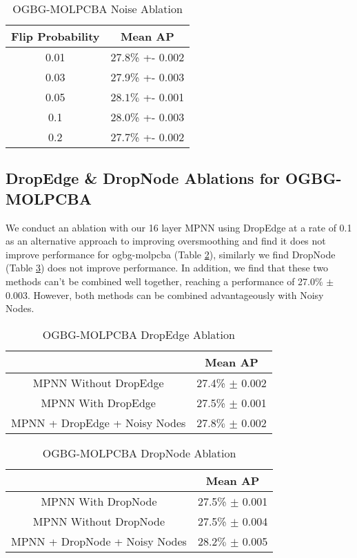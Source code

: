 \documentclass{article} \usepackage{iclr2022_conference,times}
\begin{document}
\begin{table}[]
    \centering
    \begin{tabular}{c|c}
        \toprule
        Flip Probability & Mean AP \\
        \midrule
        0.01 &  27.8\% +- 0.002 \\
        0.03 &  27.9\% +- 0.003 \\
        0.05 & $\bm{28.1}\%$ +- 0.001 \\
        0.1 & 28.0\% +- 0.003 \\
        0.2 & 27.7\% +- 0.002 \\
        \bottomrule
    \end{tabular}
    \caption{OGBG-MOLPCBA Noise Ablation}
    \label{tab:ogbg-molpcba-noise}
\end{table}

\subsection{DropEdge \& DropNode Ablations for OGBG-MOLPCBA}\label{dropedge-ogbg-molpcba}

We conduct an ablation with our 16 layer MPNN  using DropEdge at a rate of 0.1 as an alternative approach to improving oversmoothing and find it does not improve performance for ogbg-molpcba (Table \ref{tab:ogbg-molpcba-dropedge}), similarly we find DropNode (Table \ref{tab:ogbg-molpcba-dropnode}) does not improve performance. In addition, we find that these two methods can't be combined well together, reaching a performance of 27.0\% $\pm$ 0.003. However, both methods can be combined advantageously with Noisy Nodes.

\begin{table}[]
    \centering
    \begin{tabular}{c|c}
        \toprule
         & Mean AP \\
        \midrule
        MPNN Without DropEdge & 27.4\% $\pm$ 0.002 \\
        MPNN With DropEdge &  27.5\% $\pm$ 0.001 \\
        MPNN + DropEdge + Noisy Nodes &  $\bm{27.8\%}$ $\pm$ 0.002 \\
        \bottomrule
    \end{tabular}
    \caption{OGBG-MOLPCBA DropEdge Ablation}
    \label{tab:ogbg-molpcba-dropedge}
\end{table}

\begin{table}[]
    \centering
    \begin{tabular}{c|c}
        \toprule
         & Mean AP \\
        \midrule
        MPNN With DropNode &  27.5\% $\pm$ 0.001 \\
        MPNN Without DropNode & 27.5\% $\pm$ 0.004 \\
        MPNN + DropNode + Noisy Nodes &  $\bm{28.2\%}$ $\pm$ 0.005 \\
        \bottomrule
    \end{tabular}
    \caption{OGBG-MOLPCBA DropNode Ablation}
    \label{tab:ogbg-molpcba-dropnode}
\end{table}
\end{document}
